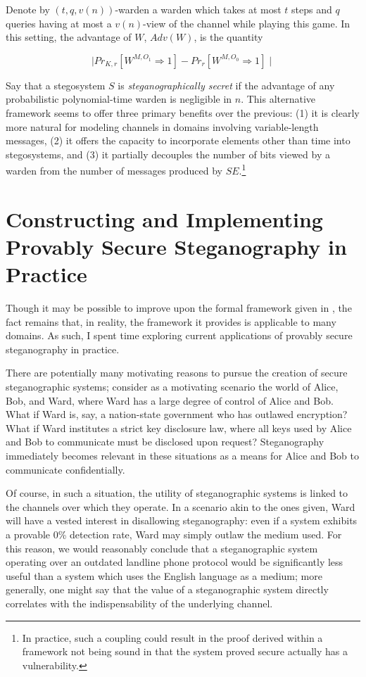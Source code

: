 \documentclass{article}
\begin{document}
Denote by $(t,q,v(n))$-warden a warden which takes at most $t$ steps and $q$ queries having at most a $v(n)$-view of the 
channel while playing this game.  In this setting, the advantage of $W$, $Adv(W)$, is the quantity

\[ \mid Pr_{K,r}[W^{M,O_1} \Rightarrow 1] - Pr_{r}[W^{M,O_0} \Rightarrow 1] \mid \]

Say that a stegosystem $S$ is \textit{steganographically secret} if the advantage of any probabilistic polynomial-time warden 
is negligible in $n$.
\newline\newline
This alternative framework seems to offer three primary benefits over the previous: (1) it is clearly more natural for 
modeling channels in domains involving variable-length messages, (2) it offers the capacity to incorporate elements 
other than time into stegosystems, and (3) it partially decouples the number of bits viewed by a warden from the number of 
messages produced by $SE$.\footnote{In practice, such a coupling could result in the proof derived within a framework 
not being sound in that the system proved secure actually has a vulnerability.}

\section{Constructing and Implementing Provably Secure Steganography in Practice}

Though it may be possible to improve upon the formal framework given in \cite{BiglouPSS}, the fact 
remains that, in reality, the framework it provides is applicable to many domains.  As such, 
I spent time exploring current applications of provably secure steganography in practice.

There are potentially many motivating reasons to pursue the creation of secure steganographic 
systems; consider as a motivating scenario the world of Alice, Bob, and Ward, where Ward has a 
large degree of control of Alice and Bob.  What if Ward is, say, a nation-state government who has outlawed 
encryption?  What if Ward institutes a strict key disclosure law, where all keys used by Alice and Bob to communicate 
must be disclosed upon request?  Steganography immediately becomes relevant in these situations as a means for 
Alice and Bob to communicate confidentially.

Of course, in such a situation, the utility of steganographic systems is linked to the channels 
over which they operate.  In a scenario akin to the ones given, Ward will have a vested interest 
in disallowing steganography: even if a system exhibits a provable 0\% detection rate, Ward may 
simply outlaw the medium used.  For this reason, we would reasonably conclude that a 
steganographic system operating over an outdated landline phone protocol would be significantly 
less useful than a system which uses the English language as a medium; more generally, one might say that the
value of a steganographic system directly correlates with the indispensability 
of the underlying channel.
\end{document}
